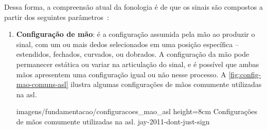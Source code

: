 Dessa forma, a compreensão atual da fonologia é de que os sinais são compostos a partir dos seguintes parâmetros~\cite{stewart-2021-barrons-asl,jay-2011-dont-just-sign,quadros-2004-estudos-linguisticos}:

\begin{enumerate}
   \item \textbf{Configuração de mão}: é a configuração assumida pela mão ao produzir o sinal, com um ou mais dedos selecionados em uma posição específica -- estendidos, fechados, curvados, ou dobrados. A configuração da mão pode permanecer estática ou variar na articulação do sinal, e é possível que ambas mãos apresentem uma configuração igual ou não nesse processo. A \autoref{fig:config-mao-comuns-asl} ilustra algumas configurações de mãos comumente utilizadas na \acrshort{asl}.
   
        {imagens/fundamentacao/configuracoes_mao_asl} %
        {height=8cm} %
        {Configurações de mãos comumente utilizadas na \acrshort{asl}.} %
        {jay-2011-dont-just-sign} %








\end{enumerate}
